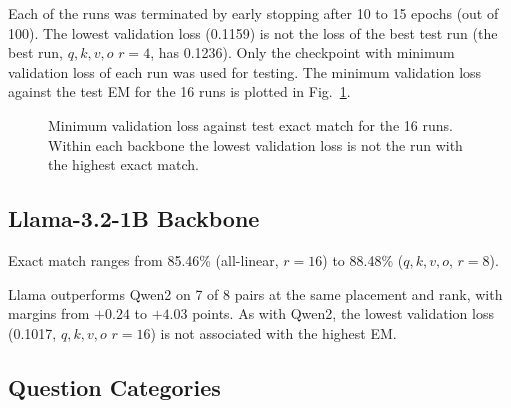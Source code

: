 \documentclass[conference]{IEEEtran}
\begin{document}
Each of the runs was terminated by early stopping after 10 to 15 epochs (out of 100). The lowest validation loss (0.1159) is not the loss of the best test run (the best run, $q,k,v,o$ $r=4$, has 0.1236). Only the checkpoint with minimum validation loss of each run was used for testing. The minimum validation loss against the test EM for the 16 runs is plotted in Fig.~\ref{fig:valloss}.

\begin{figure}[!t]
  \centering
  \caption{Minimum validation loss against test exact match for the 16 runs. Within each backbone the lowest validation loss is not the run with the highest exact match.}
  \label{fig:valloss}
\end{figure}

\subsection{Llama-3.2-1B Backbone}\label{sec:llama}

Exact match ranges from 85.46\% (all-linear, $r=16$) to 88.48\% ($q,k,v,o$, $r=8$).

Llama outperforms Qwen2 on 7 of 8 pairs at the same placement and rank, with margins from $+0.24$ to $+4.03$ points. As with Qwen2, the lowest validation loss (0.1017, $q,k,v,o$ $r=16$) is not associated with the highest EM.

\subsection{Question Categories}
\end{document}
